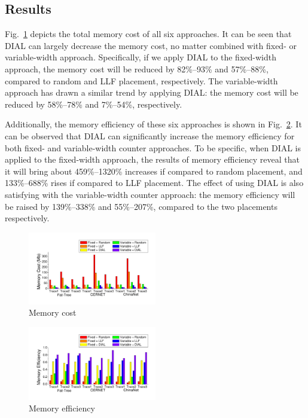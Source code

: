 \subsection{Results}
Fig.~\ref{fig:memory-cost} depicts the total memory cost of all six approaches.
It can be seen that DIAL can largely decrease the memory cost, no matter combined with fixed- or variable-width approach.
Specifically, if we apply DIAL to the fixed-width approach, the memory cost will be reduced by 82\%--93\% and 57\%--88\%, compared to random and LLF placement, respectively.
The variable-width approach has drawn a similar trend by applying DIAL:
the memory cost will be reduced by 58\%--78\% and 7\%--54\%, respectively.

Additionally, the memory efficiency of these six approaches is shown in Fig.~\ref{fig:memory-efficiency}.
It can be observed that DIAL can significantly increase the memory efficiency for both fixed- and variable-width counter approaches.
To be specific, when DIAL is applied to the fixed-width approach, the results of memory efficiency reveal that it will bring about 459\%--1320\% increases if compared to random placement, and 133\%--688\% rises if compared to LLF placement.
The effect of using DIAL is also satisfying with the variable-width counter approach:
the memory efficiency will be raised by 139\%--338\% and 55\%--207\%, compared to the two placements respectively.

\begin{figure}[t]
\centering
\vspace{-0.2in}
\includegraphics[width=0.5\textwidth]{DATA/cost.pdf}
\vspace{-0.4in}
\caption{Memory cost}
\label{fig:memory-cost}
\vspace{-0.2in}
\end{figure}

\begin{figure}[t]
\centering
\includegraphics[width=0.5\textwidth]{DATA/efficiency.pdf}
\vspace{-0.4in}
\caption{Memory efficiency}
\label{fig:memory-efficiency}
\vspace{-0.2in}
\end{figure}


